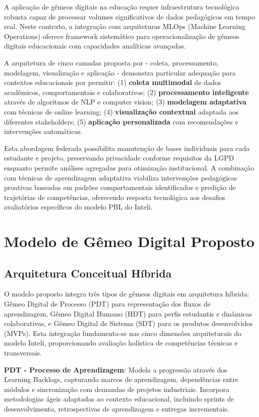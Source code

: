 \documentclass[english, spanish, brazilian]{RBIEarticle} %
\begin{document}
A aplicação de gêmeos digitais na educação requer infraestrutura tecnológica
robusta capaz de processar volumes significativos de dados pedagógicos em tempo
real. Neste contexto, a integração com arquiteturas MLOps (Machine Learning
Operations) oferece framework sistemático para operacionalização de gêmeos
digitais educacionais com capacidades analíticas avançadas.

A arquitetura de cinco camadas proposta por \cite{Fujii2022} - coleta,
processamento, modelagem, visualização e aplicação - demonstra particular
adequação para contextos educacionais por permitir: (1) \textbf{coleta
  multimodal} de dados acadêmicos, comportamentais e colaborativos; (2)
\textbf{processamento inteligente} através de algoritmos de NLP e computer
vision; (3) \textbf{modelagem adaptativa} com técnicas de online learning; (4)
\textbf{visualização contextual} adaptada aos diferentes stakeholders; (5)
\textbf{aplicação personalizada} com recomendações e intervenções automáticas.

Esta abordagem federada possibilita manutenção de bases individuais para cada
estudante e projeto, preservando privacidade conforme requisitos da LGPD
enquanto permite análises agregadas para otimização institucional. A combinação
com técnicas de aprendizagem adaptativa viabiliza intervenções pedagógicas
proativas baseadas em padrões comportamentais identificados e predição de
trajetórias de competências, oferecendo resposta tecnológica aos desafios
avaliatórios específicos do modelo PBL do Inteli.

\section{Modelo de Gêmeo Digital Proposto}

\subsection{Arquitetura Conceitual Híbrida}

O modelo proposto integra três tipos de gêmeos digitais em arquitetura híbrida:
Gêmeo Digital de Processo (PDT) para representação dos fluxos de aprendizagem,
Gêmeo Digital Humano (HDT) para perfis estudantis e dinâmicas colaborativas, e
Gêmeo Digital de Sistema (SDT) para os produtos desenvolvidos (MVPs). Esta
integração fundamenta-se nas cinco dimensões arquiteturais do modelo Inteli,
proporcionando avaliação holística de competências técnicas e transversais.

\textbf{PDT - Processo de Aprendizagem}: Modela a progressão através dos Learning Backlogs, capturando marcos de aprendizagem, dependências entre módulos e sincronização com demandas de projetos industriais. Incorpora metodologias ágeis adaptadas ao contexto educacional, incluindo sprints de desenvolvimento, retrospectivas de aprendizagem e entregas incrementais.
\end{document}

